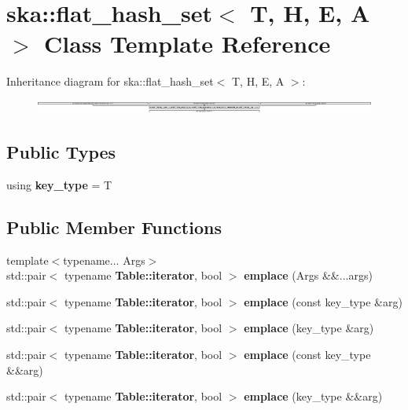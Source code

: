 \section{ska\+:\+:flat\+\_\+hash\+\_\+set$<$ T, H, E, A $>$ Class Template Reference}
\label{classska_1_1flat__hash__set}
Inheritance diagram for ska\+:\+:flat\+\_\+hash\+\_\+set$<$ T, H, E, A $>$\+:\begin{figure}[H]
\begin{center}
\leavevmode
\includegraphics[height=0.454915cm]{classska_1_1flat__hash__set}
\end{center}
\end{figure}
\subsection*{Public Types}
\begin{DoxyCompactItemize}
\item 
using {\bfseries key\+\_\+type} = T\label{classska_1_1flat__hash__set_a2e9fb96bdde61d77d3a05f4457e96289}

\end{DoxyCompactItemize}
\subsection*{Public Member Functions}
\begin{DoxyCompactItemize}
\item 
{\footnotesize template$<$typename... Args$>$ }\\std\+::pair$<$ typename {\bf Table\+::iterator}, bool $>$ {\bfseries emplace} (Args \&\&...args)\label{classska_1_1flat__hash__set_ad92ec1589a6548f38756badd324f9e82}

\item 
std\+::pair$<$ typename {\bf Table\+::iterator}, bool $>$ {\bfseries emplace} (const key\+\_\+type \&arg)\label{classska_1_1flat__hash__set_aa93b866342936f757aa1b9ac4846886f}

\item 
std\+::pair$<$ typename {\bf Table\+::iterator}, bool $>$ {\bfseries emplace} (key\+\_\+type \&arg)\label{classska_1_1flat__hash__set_a8ba97bef14dbc916412381ca6fbb469f}

\item 
std\+::pair$<$ typename {\bf Table\+::iterator}, bool $>$ {\bfseries emplace} (const key\+\_\+type \&\&arg)\label{classska_1_1flat__hash__set_a48673c1c502f55811391ae15c700269a}

\item 
std\+::pair$<$ typename {\bf Table\+::iterator}, bool $>$ {\bfseries emplace} (key\+\_\+type \&\&arg)\label{classska_1_1flat__hash__set_a22a0114b463d2c3b598bf367e5266c92}

\end{DoxyCompactItemize}
